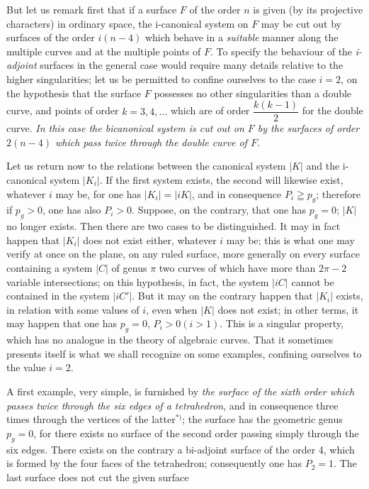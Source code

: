 \documentclass{article}
\begin{document}
But let us remark first that if a surface $F$ of the order $n$ is given (by its projective characters) in ordinary space, the i-canonical system on $F$ may be cut out by surfaces of the order $i(n-4)$ which behave in a \emph{suitable} manner along the multiple curves and at the multiple points of $F$. To specify the behaviour of the \emph{i-adjoint} surfaces in the general case would require many details relative to the higher singularities; let us be permitted to confine ourselves to the case $i = 2$, on the hypothesis that the surface $F$ possesses no other singularities than a double curve, and points of order $k = 3, 4, \ldots$ which are of order $\dfrac{k(k-1)}{2}$ for the double curve. \emph{In this case the bicanonical system is cut out on $F$ by the surfaces of order $2(n-4)$ which pass twice through the double curve of $F$.}

Let us return now to the relations between the canonical system $|K|$ and the i-canonical system $|K_{i}|$. If the first system exists, the second will likewise exist, whatever $i$ may be, for one has $|K_{i}| = |iK|$, and in consequence $P_{i} \geqq p_{g}$; therefore if $p_{g} > 0$, one has also $P_{i} > 0$. Suppose, on the contrary, that one has $p_{g} = 0$; $|K|$ no longer exists. Then there are two cases to be distinguished. It may in fact happen that $|K_{i}|$ does not exist either, whatever $i$ may be; this is what one may verify at once on the plane, on any ruled surface, more generally on every surface containing a system $|C|$ of genus $\pi$ two curves of which have more than $2\pi - 2$ variable intersections; on this hypothesis, in fact, the system $|iC|$ cannot be contained in the system $|iC'|$. But it may on the contrary happen that $|K_{i}|$ exists, in relation with some values of $i$, even when $|K|$ does not exist; in other terms, it may happen that one has $p_{g} = 0$, $P_{i} > 0 (i > 1)$. This is a singular property, which has no analogue in the theory of algebraic curves. That it sometimes presents itself is what we shall recognize on some examples, confining ourselves to the value $i = 2$.

A first example, very simple, is furnished by \emph{the surface of the sixth order which passes twice through the six edges of a tetrahedron}, and in consequence three times through the vertices of the latter${}^{*)}$; the surface has the geometric genus $p_{g} = 0$, for there exists no surface of the second order passing simply through the six edges. There exists on the contrary a bi-adjoint surface of the order 4, which is formed by the four faces of the tetrahedron; consequently one has $P_{2} = 1$. The last surface does not cut the given surface
\end{document}
